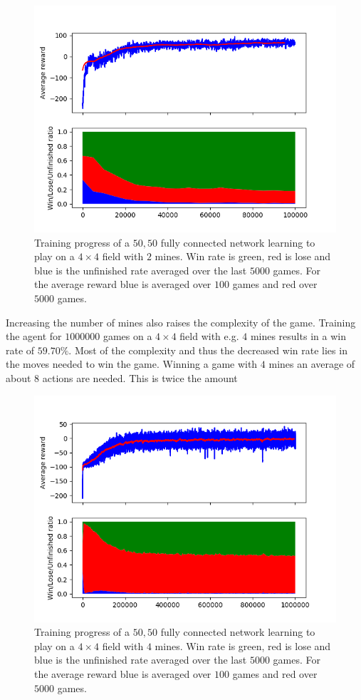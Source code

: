 \begin{figure}
	\centering
	\includegraphics[width=\textwidth]{images/4_4_2_fully.png}
	\caption{Training progress of a $50,50$ fully connected network learning to play on a $4 \times 4$ field with $2$ mines. Win rate is green, red is lose and blue is the unfinished rate averaged over the last $5000$ games. For the average reward blue is averaged over $100$ games and red over $5000$ games.}
	\label{fig:4_4_2_fully}
\end{figure}

Increasing the number of mines also raises the complexity of the game.
Training the agent for $1000000$ games on a $4 \times 4$ field with e.g. $4$ mines results in a win rate of $59.70\%$.
Most of the complexity and thus the decreased win rate lies in the moves needed to win the game.
Winning a game with $4$ mines an average of about $8$ actions are needed.
This is twice the amount 

\begin{figure}
	\centering
	\includegraphics[width=\textwidth]{images/4_4_4_fully.png}
	\caption{Training progress of a $50,50$ fully connected network learning to play on a $4 \times 4$ field with $4$ mines. Win rate is green, red is lose and blue is the unfinished rate averaged over the last $5000$ games. For the average reward blue is averaged over $100$ games and red over $5000$ games.}
	\label{fig:4_4_4_fully}
\end{figure}

